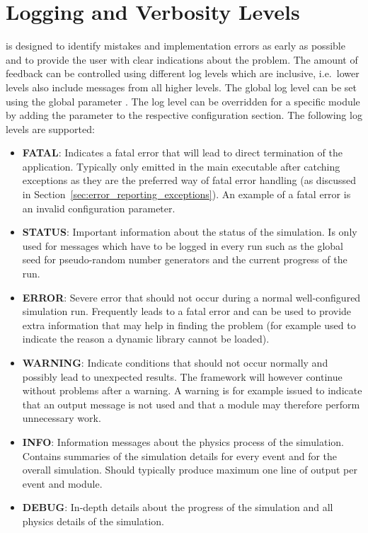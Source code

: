 \section{Logging and Verbosity Levels}
\label{sec:logging_verbosity}
\apsq is designed to identify mistakes and implementation errors as early as possible and to provide the user with clear indications about the problem.
The amount of feedback can be controlled using different log levels which are inclusive, i.e.\ lower levels also include messages from all higher levels.
The global log level can be set using the global parameter .
The log level can be overridden for a specific module by adding the  parameter to the respective configuration section.
The following log levels are supported:
\begin{itemize}
\item \textbf{FATAL}: Indicates a fatal error that will lead to direct termination of the application.
Typically only emitted in the main executable after catching exceptions as they are the preferred way of fatal error handling (as discussed in Section~\ref{sec:error_reporting_exceptions}).
An example of a fatal error is an invalid configuration parameter.
\item \textbf{STATUS}: Important information about the status of the simulation.
Is only used for messages which have to be logged in every run such as the global seed for pseudo-random number generators and the current progress of the run.
\item \textbf{ERROR}: Severe error that should not occur during a normal well-configured simulation run.
Frequently leads to a fatal error and can be used to provide extra information that may help in finding the problem (for example used to indicate the reason a dynamic library cannot be loaded).
\item \textbf{WARNING}: Indicate conditions that should not occur normally and possibly lead to unexpected results.
The framework will however continue without problems after a warning.
A warning is for example issued to indicate that an output message is not used and that a module may therefore perform unnecessary work.
\item \textbf{INFO}: Information messages about the physics process of the simulation.
Contains summaries of the simulation details for every event and for the overall simulation.
Should typically produce maximum one line of output per event and module.
\item \textbf{DEBUG}: In-depth details about the progress of the simulation and all physics details of the simulation.

\end{itemize}
